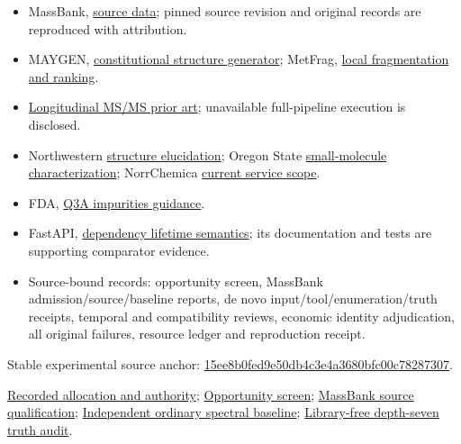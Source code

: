 \documentclass[
  10pt,
]{article}
\providecommand{\tightlist}{%
  \setlength{\itemsep}{0pt}\setlength{\parskip}{0pt}}
\begin{document}
\begin{itemize}
\tightlist
\item
  MassBank, \href{https://github.com/MassBank/MassBank-data}{source
  data}; pinned source revision and original records are reproduced with
  attribution.
\item
  MAYGEN,
  \href{https://github.com/MehmetAzizYirik/MAYGEN}{constitutional
  structure generator}; MetFrag,
  \href{https://github.com/ipb-halle/MetFragRelaunched}{local
  fragmentation and ranking}.
\item
  \href{https://github.com/academicCQMD/LongitudinalProf-MSMS-Method}{Longitudinal
  MS/MS prior art}; unavailable full-pipeline execution is disclosed.
\item
  Northwestern
  \href{https://imserc.northwestern.edu/services-nmr-se.html}{structure
  elucidation}; Oregon State
  \href{https://nmr.science.oregonstate.edu/small-molecule-characterization}{small-molecule
  characterization}; NorrChemica
  \href{https://www.norrchemica.com/pages/nmr-service}{current service
  scope}.
\item
  FDA,
  \href{https://www.fda.gov/regulatory-information/search-fda-guidance-documents/q3ar-impurities-new-drug-substances}{Q3A
  impurities guidance}.
\item
  FastAPI,
  \href{https://fastapi.tiangolo.com/advanced/advanced-dependencies/}{dependency
  lifetime semantics}; its documentation and tests are supporting
  comparator evidence.
\item
  Source-bound records: opportunity screen, MassBank
  admission/source/baseline reports, de novo
  input/tool/enumeration/truth receipts, temporal and compatibility
  reviews, economic identity adjudication, all original failures,
  resource ledger and reproduction receipt.
\end{itemize}

Stable experimental source anchor:
\href{https://github.com/MontrealAI/AGI-Alpha-Invention-Flywheel-Lab/tree/15ee8b0fed9e50db4c3e4a3680bfc00c78287307}{15ee8b0fed9e50db4c3e4a3680bfc00c78287307}.

\href{https://github.com/MontrealAI/AGI-Alpha-Invention-Flywheel-Lab/blob/15ee8b0fed9e50db4c3e4a3680bfc00c78287307/campaign/cycle-007/ALLOCATION.json}{Recorded
allocation and authority};
\href{https://github.com/MontrealAI/AGI-Alpha-Invention-Flywheel-Lab/blob/15ee8b0fed9e50db4c3e4a3680bfc00c78287307/campaign/cycle-007/OPPORTUNITY_SCREEN.json}{Opportunity
screen};
\href{https://github.com/MontrealAI/AGI-Alpha-Invention-Flywheel-Lab/blob/15ee8b0fed9e50db4c3e4a3680bfc00c78287307/evidence/cycle-007/massbank-source-verification/REPORT.json}{MassBank
source qualification};
\href{https://github.com/MontrealAI/AGI-Alpha-Invention-Flywheel-Lab/blob/15ee8b0fed9e50db4c3e4a3680bfc00c78287307/evidence/cycle-007/massbank-baseline-verification/REPORT.json}{Independent
ordinary spectral baseline};
\href{https://github.com/MontrealAI/AGI-Alpha-Invention-Flywheel-Lab/blob/15ee8b0fed9e50db4c3e4a3680bfc00c78287307/evidence/cycle-007/denovo-verification-strong_depth7-v2/REPORT.json}{Library-free
depth-seven truth audit}.
\end{document}
